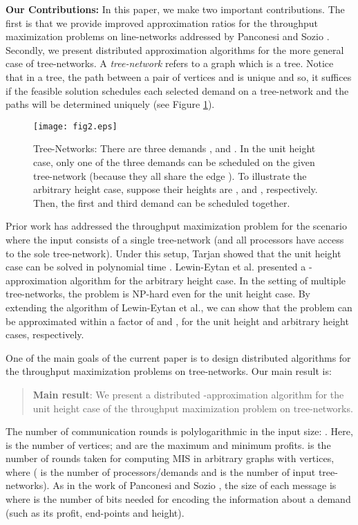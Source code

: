\documentclass[11pt]{article}
\begin{document}
\noindent
{\bf Our Contributions: }In this paper, we make two important contributions. 
The first is that we provide improved approximation ratios
for the throughput maximization problems on line-networks addressed by Panconesi and Sozio \cite{Pancj}. 
Secondly, we present distributed approximation algorithms for the more general case of tree-networks.
A {\em tree-network} refers to a graph which is a tree. 
Notice that in a tree, the path between a pair of vertices  and  is unique
and so, it suffices if the feasible solution schedules each selected demand on a tree-network
and the paths will be determined uniquely (see Figure \ref{fig:2}).

\begin{figure}[t]
\centering
\texttt{[image: fig2.eps]}
\caption{
Tree-Networks: There are three demands ,  and .
In the unit height case, only one of the three demands can be scheduled on the given tree-network
(because they all share the edge ).
To illustrate the arbitrary height case, suppose their heights are ,  and , respectively.
Then, the first and third demand can be scheduled together.
}
\label{fig:2}
\end{figure}

Prior work has addressed the throughput maximization problem for the scenario where
the input consists of a single tree-network (and all processors have access to the sole tree-network).
Under this setup, Tarjan showed that the unit height case can be solved in polynomial time \cite{Tarjan}.
Lewin-Eytan et al. \cite{Lewin-Eytan} presented a -approximation algorithm for the arbitrary height case.
In the setting of multiple tree-networks, the problem is NP-hard even for the unit height case.
By extending the algorithm of Lewin-Eytan et al., we can show that the problem 
can be approximated within a factor of  and , for the unit height and arbitrary height cases, respectively.

One of the main goals of the current paper is to design distributed algorithms
for the throughput maximization problems on tree-networks. 
Our main result is:
\begin{quote}
{\bf Main result}: We present a distributed -approximation algorithm for the unit height case of the 
throughput maximization problem on tree-networks. 
\end{quote}
The number of communication rounds is polylogarithmic in the input size:
.
Here,  is the number of vertices;
 and  are the maximum and minimum profits.
 is the number of rounds taken for computing MIS in arbitrary graphs with  vertices,
where  ( is the number of processors/demands and  is the number of input tree-networks).
As in the work of Panconesi and Sozio \cite{Pancj}, the size of each message is
 where  is the number of bits needed for encoding the information about a demand 
(such as its profit, end-points and height).
\end{document}
